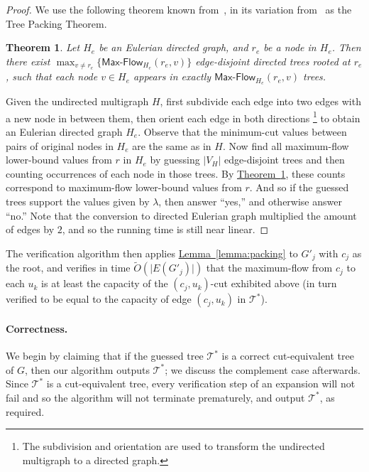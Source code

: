\documentclass[11pt]{article}
\numberwithin{equation}{section}
\newtheorem{theorem}{Theorem}[section]
\theoremstyle{definition}
\theoremstyle{plain}
\newcommand{\expref}[2]{\hyperref[#2]{#1~\ref{#2}}}
\theoremstyle{plain}
\newcommand{\ProblemName}[1]{\textsf{#1}}
\newcommand{\MF}{\ProblemName{Max-Flow}\xspace}
\newcommand\tO{\ensuremath{\widetilde O}}  %
\newcommand{\TG}{\mathcal{T}^*}
\providecommand{\card}[1]{\lvert#1\rvert}
\begin{document}
\begin{proof}
We use the following theorem known from~\cite[Theorem $2.7$]{Bang-Jensen95},
in its variation from~\cite{Cole03} as the Tree Packing Theorem.

\begin{theorem}\label{theorem:BHKP}
Let $H_e$ be an Eulerian directed graph, and $r_e$ be a node in $H_e$.
Then there exist $\max_{v\neq r_e}\{\MF_{H_e}(r_e,v)\}$ edge-disjoint directed trees rooted at $r_e$, such that each node $v\in H_e$ appears in exactly $\MF_{H_e}(r_e,v)$ trees.
\end{theorem}

Given the undirected multigraph $H$, first subdivide each edge into two edges with a new node in between them,
then orient each edge in both directions%
\footnote{The subdivision and orientation are used to transform
  the undirected multigraph to a directed graph.
}
to obtain an Eulerian directed graph $H_e$.
Observe that the minimum-cut values between pairs of original nodes in $H_e$ are the same as in $H$.
%
Now find all maximum-flow lower-bound values from $r$
in $H_e$ by guessing $\card{V_H}$ edge-disjoint trees and then counting occurrences of each node in those trees. By \expref{Theorem}{theorem:BHKP}, these counts correspond to maximum-flow lower-bound values from $r$. And so if the guessed trees support the values given by $\lambda$, then answer ``yes,'' and otherwise answer ``no.'' Note that the conversion to directed Eulerian graph multiplied the amount of edges by $2$, and so the running time is still near linear.
\end{proof}


The verification algorithm then applies \expref{Lemma}{lemma:packing}
to $G'_j$ with $c_j$ as the root, and verifies in time $\tO(\card{E(G'_j)})$
that the maximum-flow from $c_j$ to each $u_k$
is at least the capacity of the $(c_j,u_k)$-cut exhibited above
(in turn verified to be equal to the capacity of edge $(c_j, u_k)$ in $\TG$).


\paragraph{Correctness.}

We begin by claiming that if the guessed tree $\TG$ is a correct cut-equivalent tree of $G$, then our algorithm outputs $\TG$; we discuss the complement case afterwards.
Since $\TG$ is a cut-equivalent tree, every verification step of an expansion will not fail and so the algorithm will not terminate prematurely, and output $\TG$, as required.
\end{document}
